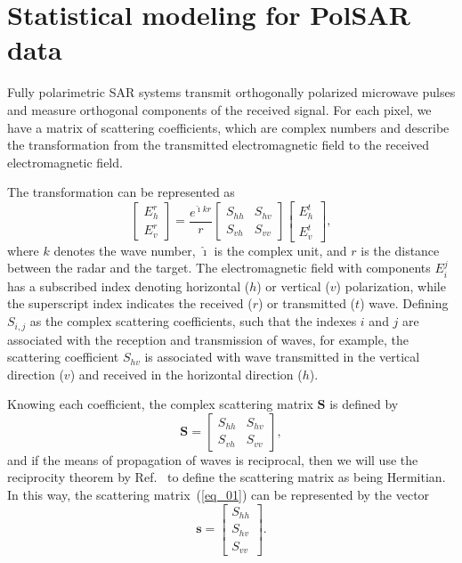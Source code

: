 \documentclass[conference]{IEEEtran}
\begin{document}
\section{Statistical modeling for PolSAR data}\label{sec_02}

Fully polarimetric SAR systems transmit orthogonally polarized microwave pulses and measure orthogonal components of the received signal. 
For each pixel, we have a matrix of scattering coefficients, which are complex numbers and describe the transformation from the transmitted electromagnetic field to the received electromagnetic field.

The transformation can be represented as
\begin{equation*}
 \left[
\begin{array}{c}
	E_{h}^{r}   \\
	E_{v}^{r}    
\end{array}
\right]
 = \frac{e^{\hat{\imath} kr}}{r}\left[
\begin{array}{cc}
	S_{hh}   & S_{hv}   \\
	S_{vh}   & S_{vv}   
\end{array}
\right]
 \left[
\begin{array}{c}
	E_{h}^{t}   \\
	E_{v}^{t}    
\end{array}
\right],
\end{equation*}
where $k$ denotes the wave number, $\hat{\imath}$ is the complex unit, and $r$ is the distance between the radar and the target. 
The electromagnetic field with components $E_{i}^{j}$ has a subscribed index denoting horizontal ($h$) or vertical ($v$) polarization, while the superscript index indicates the received ($r$) or transmitted ($t$) wave. 
Defining $S_{i,j}$ as the complex scattering coefficients, such that the indexes $i$ and $j$ are associated with the reception and transmission of waves, for example, the scattering coefficient $S_{hv}$ is associated with wave transmitted in the vertical direction ($v$) and received in the horizontal direction ($h$).

Knowing each coefficient, the complex scattering matrix $\mathbf{S}$ is defined by
\begin{equation}\label{eq_01}
\mathbf{S} = \left[
\begin{array}{cc}
	S_{hh}   & S_{hv}   \\
	S_{vh}   & S_{vv}   
\end{array}
\right],
\end{equation}
and if the means of propagation of waves is reciprocal, then we will use the reciprocity theorem by Ref.~\cite{lp} to define the scattering matrix as being Hermitian. 
In this way, the scattering matrix~(\ref{eq_01}) can be represented by the vector
\begin{equation}\label{eq_02}
\mathbf{s} = \left[
\begin{array}{c}
	S_{hh}     \\
    S_{hv}     \\
	S_{vv}    
\end{array}
\right].
\end{equation}
\end{document}
